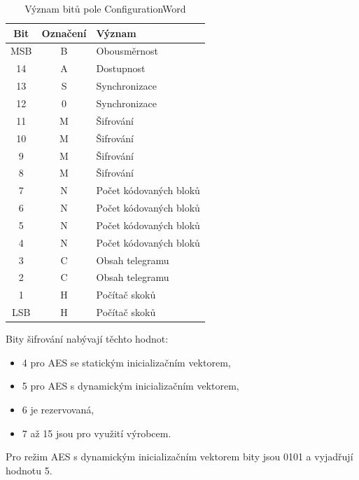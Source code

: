 \begin{table}[!ht]
\centering
\caption{Význam bitů pole ConfigurationWord}
\label{TableConfigurationWord}
\begin{tabular}{|c|c|l|}
\hline
\textbf{Bit} & \textbf{Označení} & \textbf{Význam}        \\ \hline \hline
MSB          & B                 & Obousměrnost           \\ \hline
14           & A                 & Dostupnost             \\ \hline
13           & S                 & Synchronizace          \\ \hline
12           & 0                 & Synchronizace          \\ \hline
11           & M                 & Šifrování              \\ \hline
10           & M                 & Šifrování              \\ \hline
9            & M                 & Šifrování              \\ \hline
8            & M                 & Šifrování              \\ \hline
7            & N                 & Počet kódovaných bloků \\ \hline
6            & N                 & Počet kódovaných bloků \\ \hline
5            & N                 & Počet kódovaných bloků \\ \hline
4            & N                 & Počet kódovaných bloků \\ \hline
3            & C                 & Obsah telegramu        \\ \hline
2            & C                 & Obsah telegramu        \\ \hline
1            & H                 & Počítač skoků          \\ \hline
LSB          & H                 & Počítač skoků          \\  \hline  \hline
\end{tabular}
\end{table}

\newpage
Bity šifrování nabývají těchto hodnot:
\begin{itemize}
	\item 4 pro AES se statickým inicializačním vektorem,
	\item 5 pro AES s dynamickým inicializačním vektorem,
	\item 6 je rezervovaná,
	\item 7 až 15 jsou pro využití výrobcem.
\end{itemize}
Pro režim AES s dynamickým inicializačním vektorem bity jsou 0101 a vyjadřují hodnotu 5.


